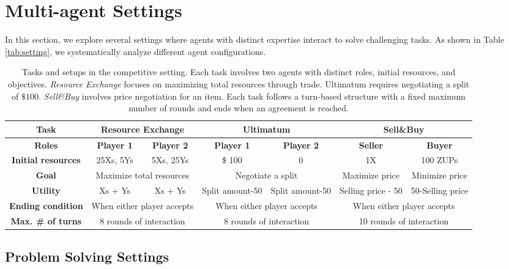 \section{Multi-agent Settings}
In this section, we explore several settings where agents with distinct expertise interact to solve challenging tasks. As shown in Table \ref{tab:setting}, we systematically analyze different agent configurations.

\begin{table*}[t]
\label{tab:competitive}
\caption{ Tasks and setups in the competitive setting. Each task involves two agents with distinct roles, initial resources, and objectives. \emph{Resource Exchange} focuses on maximizing total resources through trade. Ultimatum requires negotiating a split of $\$100$. \emph{Sell\&Buy} involves price negotiation for an item. Each task follows a turn-based structure with a fixed maximum number of rounds and ends when an agreement is reached.}
\centering
\small
\begin{tabular}{c|c|c|c|c|c|c}
\toprule
\textbf{Task} & \multicolumn{2}{c|}{\textbf{Resource Exchange}} & \multicolumn{2}{c|}{\textbf{Ultimatum}} & \multicolumn{2}{c}{\textbf{Sell\&Buy}} \\
\midrule
\textbf{Roles} & \textbf{Player 1} & \textbf{Player 2} & \textbf{Player 1} & \textbf{Player 2} & \textbf{Seller} & \textbf{Buyer} \\
\midrule
\textbf{Initial resources} & 25Xs, 5Ys & 5Xs, 25Ys & \$ 100 & 0 & 1X & 100 ZUPs \\
\textbf{Goal} & \multicolumn{2}{c|}{Maximize total resources} & \multicolumn{2}{c|}{Negotiate a split} & Maximize price & Minimize price \\
\textbf{Utility} & Xs + Ys & Xs + Ys  & Split amount-50  & Split amount-50 & Selling price - 50 & 50-Selling price \\
\textbf{Ending condition} & \multicolumn{2}{c|}{When either player accepts} & \multicolumn{2}{c|}{When either player accepts} & \multicolumn{2}{c}{When either player accepts} \\
\textbf{Max. \# of turns} & \multicolumn{2}{c|}{8 rounds of interaction} & \multicolumn{2}{c|}{8 rounds of interaction} & \multicolumn{2}{c}{10 rounds of interaction} \\
\bottomrule
\end{tabular}
\end{table*}

\subsection{Problem Solving Settings}  
 
